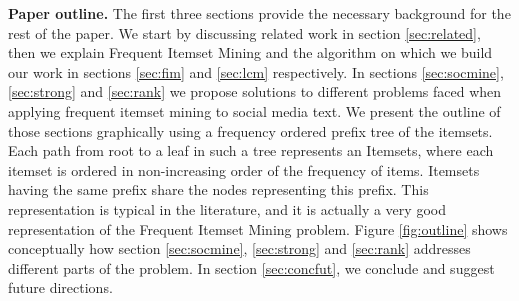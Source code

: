 \documentclass{sig-alternate}
\begin{document}
\textbf{Paper outline.} The first three sections provide the necessary background for the rest of the paper. We start by discussing related work in section \ref{sec:related}, then we explain Frequent Itemset Mining and the algorithm on which we build our work in sections \ref{sec:fim} and \ref{sec:lcm} respectively. In sections \ref{sec:socmine}, \ref{sec:strong} and \ref{sec:rank} we propose solutions to different problems faced when applying frequent itemset mining to social media text. We present the outline of those sections graphically using a frequency ordered prefix tree of the itemsets. Each path from root to a leaf in such a tree represents an Itemsets, where each itemset is ordered in non-increasing order of the frequency of items. Itemsets having the same prefix share the nodes representing this prefix. This representation is typical in the literature, and it is actually a very good representation of the Frequent Itemset Mining problem. Figure \ref{fig:outline} shows conceptually how section  \ref{sec:socmine}, \ref{sec:strong} and \ref{sec:rank}  addresses different parts of the problem. In section \ref{sec:concfut}, we conclude and suggest future directions.

\end{document}
